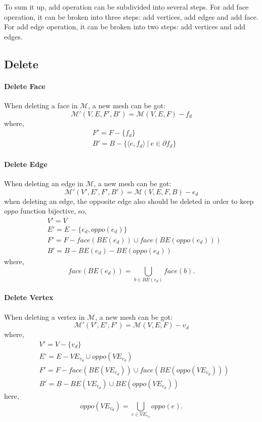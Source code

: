\documentclass[9pt,twocolumn]{extarticle}
\begin{document}
To sum it up, add operation can be subdivided into several steps.
For add face operation, it can be broken into three steps: add vertices, add edges
and add face. For add edge operation, it can be broken into two steps: add vertices 
and add edges.

\subsection{Delete}

\paragraph{Delete Face} When deleting a face in $\mathcal{M}$, a new mesh can be got:
\begin{equation}
\mathcal{M}'(V,E,F',B')=\mathcal{M}(V,E,F)-f_d
\end{equation}
where,
\begin{align}
&F'=F-\{f_d\}\\
&B'=B-\{\langle e,f_d \rangle \ |\ e\in \partial f_d \}
\end{align}

\paragraph{Delete Edge} When deleting an edge in $\mathcal{M}$, a new mesh can be got:
\begin{equation}
\mathcal{M}'(V',E',F',B')=\mathcal{M}(V,E,F,B)-e_d
\end{equation}
when deleting an edge, the opposite edge also should be deleted in order to keep 
$oppo$ function bijective, so,
\begin{align}
&V'=V\\
&E'=E-\{e_d,oppo(e_d)\}\\
&F'=F-face(BE(e_d))\cup face(BE(oppo(e_d)))\\
&B'=B-BE(e_d)-BE(oppo(e_d))
\end{align}
where,
\begin{equation}
face(BE(e_d))=\bigcup_{b\in BE(e_d)}face(b).
\end{equation}

\paragraph{Delete Vertex} 
When deleting a vertex in $\mathcal{M}$, a new mesh can be got:
\begin{equation}
\mathcal{M}'(V',E',F')=\mathcal{M}(V,E,F)-v_d
\end{equation}
where,
\begin{align}
&V'=V-\{v_d\}\\
&E'=E-VE_{v_d}\cup oppo(VE_{v_d})\\
&F'=F-face(BE(VE_{v_d}))\cup face(BE(oppo(VE_{v_d})))\\
&B'=B-BE(VE_{v_d})\cup BE(oppo(VE_{v_d}))
\end{align}
here,
\begin{equation}
oppo(VE_{v_d})=\bigcup_{e\in VE_{v_d}}oppo(e).
\end{equation}
\end{document}
